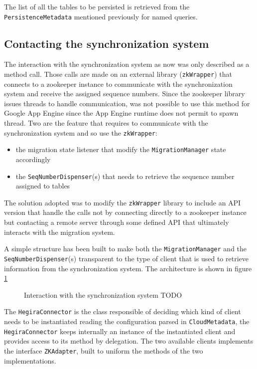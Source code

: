 \noindent The list of all the tables to be persisted is retrieved from the \texttt{PersistenceMetadata} mentioned previously for named queries.
 
\subsection{Contacting the synchronization system}
The interaction with the synchronization system as now was only described as a method call. Those calls are made on an external library (\texttt{zkWrapper}) that connects to a zookeeper instance to communicate with the synchronization system and receive the assigned sequence numbers.
Since the zookeeper library issues threads to handle communication, was not possible to use this method for Google App Engine since the App Engine runtime does not permit to spawn thread.
Two are the feature that requires to communicate with the synchronization system and so use the \texttt{zkWrapper}:
\begin{itemize}
\item the migration state listener that modify the \texttt{MigrationManager} state accordingly
\item the \texttt{SeqNumberDispenser}(s) that needs to retrieve the sequence number assigned to tables
\end{itemize} 
\noindent The solution adopted was to modify the \texttt{zkWrapper} library to include an API version that handle the calls not by connecting directly to a zookeeper instance but contacting a remote server through some defined API that ultimately interacts with the migration system.

\newparagraph A simple structure has been built to make both the \texttt{MigrationManager} and the \texttt{SeqNumberDispenser}(s) transparent to the type of client that is used to retrieve information from the synchronization system. The architecture is shown in figure \ref{fig:zk-adapter}

\begin{figure}[tbh]
  \centering
  \begin{minipage}[c][0.33\textheight][c]{0.5\textwidth}
  \end{minipage}
  \caption{Interaction with the synchronization system TODO}
  \label{fig:zk-adapter}
\end{figure} 

\noindent The \texttt{HegiraConnector} is the class responsible of deciding which kind of client needs to be instantiated reading the configuration parsed  in \texttt{CloudMetadata}, the \texttt{HegiraConnector}  keeps internally an instance of the instantiated client and provides access to its method by delegation.
The two available clients implements the interface \texttt{ZKAdapter}, built to uniform the methods of the two implementations.

